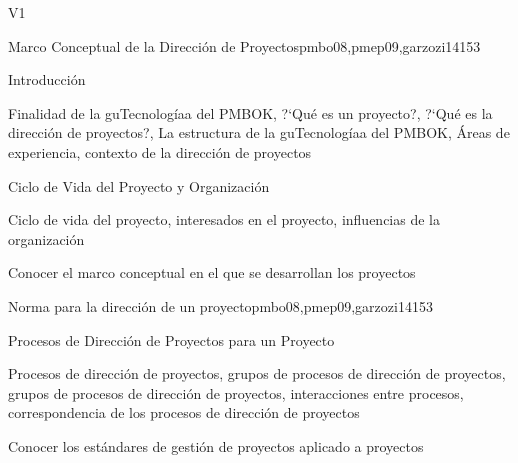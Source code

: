 \begin{syllabus}
   \begin{outcomes}{V1}
      \item {}
      \item {}
      \item {}
   \end{outcomes}
   
   \begin{unit}{Marco Conceptual de la Dirección de Proyectos}{}{pmbo08,pmep09,garzozi14}{15}{3}
   \begin{topics}
         \item Introducción
          \item Finalidad de la guTecnologíaa del PMBOK, ?`Qué es un proyecto?, ?`Qué es la dirección de proyectos?, La estructura de la guTecnologíaa del PMBOK, Áreas de experiencia, contexto de la dirección de proyectos
         \item Ciclo de Vida del Proyecto y Organización
          \item Ciclo de vida del proyecto, interesados en el proyecto, influencias de la organización
      \end{topics}
   
      \begin{learningoutcomes}
         \item Conocer el marco conceptual en el que se desarrollan los proyectos
      \end{learningoutcomes}
   \end{unit}
   
   \begin{unit}{Norma para la dirección de un proyecto}{}{pmbo08,pmep09,garzozi14}{15}{3}
   \begin{topics}
         \item Procesos de Dirección de Proyectos para un Proyecto
          \item Procesos de dirección de proyectos, grupos de procesos de dirección de proyectos, grupos de procesos de dirección de proyectos, interacciones entre procesos, correspondencia de los procesos de dirección de proyectos
      \end{topics}
   
      \begin{learningoutcomes}
         \item Conocer los estándares de gestión de proyectos aplicado a proyectos
      \end{learningoutcomes}
   \end{unit}
   

\end{syllabus}
